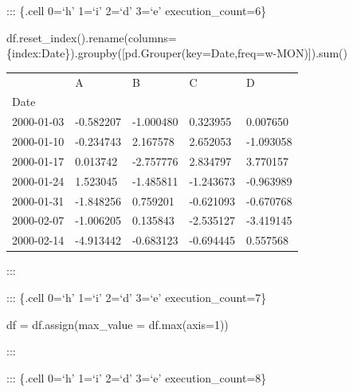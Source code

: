 \documentclass[
  letterpaper,
  DIV=11,
  numbers=noendperiod]{scrartcl}
\newenvironment{Shaded}{\begin{snugshade}}{\end{snugshade}}
\newcommand{\BuiltInTok}[1]{\textcolor[rgb]{0.00,0.23,0.31}{#1}}
\newcommand{\DecValTok}[1]{\textcolor[rgb]{0.68,0.00,0.00}{#1}}
\newcommand{\NormalTok}[1]{\textcolor[rgb]{0.00,0.23,0.31}{#1}}
\newcommand{\OperatorTok}[1]{\textcolor[rgb]{0.37,0.37,0.37}{#1}}
\newcommand{\StringTok}[1]{\textcolor[rgb]{0.13,0.47,0.30}{#1}}
\begin{document}
::: \{.cell 0=`h' 1=`i' 2=`d' 3=`e' execution\_count=6\}

\begin{Shaded}
\begin{Highlighting}[]
\NormalTok{df.reset\_index().rename(columns}\OperatorTok{=}\NormalTok{\{}\StringTok{\textquotesingle{}index\textquotesingle{}}\NormalTok{:}\StringTok{\textquotesingle{}Date\textquotesingle{}}\NormalTok{\}).groupby([pd.Grouper(key}\OperatorTok{=}\StringTok{\textquotesingle{}Date\textquotesingle{}}\NormalTok{,freq}\OperatorTok{=}\StringTok{\textquotesingle{}w{-}MON\textquotesingle{}}\NormalTok{)]).}\BuiltInTok{sum}\NormalTok{()}
\end{Highlighting}
\end{Shaded}

\begin{longtable}[]{@{}lllll@{}}
\toprule()
& A & B & C & D \\
Date & & & & \\
\midrule()
\endhead
2000-01-03 & -0.582207 & -1.000480 & 0.323955 & 0.007650 \\
2000-01-10 & -0.234743 & 2.167578 & 2.652053 & -1.093058 \\
2000-01-17 & 0.013742 & -2.757776 & 2.834797 & 3.770157 \\
2000-01-24 & 1.523045 & -1.485811 & -1.243673 & -0.963989 \\
2000-01-31 & -1.848256 & 0.759201 & -0.621093 & -0.670768 \\
2000-02-07 & -1.006205 & 0.135843 & -2.535127 & -3.419145 \\
2000-02-14 & -4.913442 & -0.683123 & -0.694445 & 0.557568 \\
\bottomrule()
\end{longtable}

:::

::: \{.cell 0=`h' 1=`i' 2=`d' 3=`e' execution\_count=7\}

\begin{Shaded}
\begin{Highlighting}[]
\NormalTok{df }\OperatorTok{=}\NormalTok{ df.assign(max\_value }\OperatorTok{=}\NormalTok{ df.}\BuiltInTok{max}\NormalTok{(axis}\OperatorTok{=}\DecValTok{1}\NormalTok{))}
\end{Highlighting}
\end{Shaded}

:::

::: \{.cell 0=`h' 1=`i' 2=`d' 3=`e' execution\_count=8\}
\end{document}

